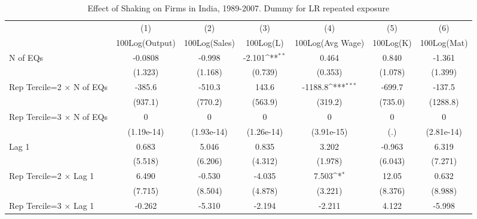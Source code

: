 \begin{table}[htbp]\centering
\def\sym#1{\ifmmode^{#1}\else\(^{#1}\)\fi}
\caption{Effect of Shaking on Firms in India, 1989-2007. Dummy for LR repeated exposure}
\begin{tabular}{l*{6}{c}}
\toprule
                &\multicolumn{1}{c}{(1)}&\multicolumn{1}{c}{(2)}&\multicolumn{1}{c}{(3)}&\multicolumn{1}{c}{(4)}&\multicolumn{1}{c}{(5)}&\multicolumn{1}{c}{(6)}\\
                &\multicolumn{1}{c}{100Log(Output)}&\multicolumn{1}{c}{100Log(Sales)}&\multicolumn{1}{c}{100Log(L)}&\multicolumn{1}{c}{100Log(Avg Wage)}&\multicolumn{1}{c}{100Log(K)}&\multicolumn{1}{c}{100Log(Mat)}\\
\midrule
N of EQs        &  -0.0808         &   -0.998         &   -2.101\sym{**} &    0.464         &    0.840         &   -1.361         \\
                &  (1.323)         &  (1.168)         &  (0.739)         &  (0.353)         &  (1.078)         &  (1.399)         \\
\addlinespace
Rep Tercile=2 $\times$ N of EQs&   -385.6         &   -510.3         &    143.6         &  -1188.8\sym{***}&   -699.7         &   -137.5         \\
                &  (937.1)         &  (770.2)         &  (563.9)         &  (319.2)         &  (735.0)         & (1288.8)         \\
\addlinespace
Rep Tercile=3 $\times$ N of EQs&        0         &        0         &        0         &        0         &        0         &        0         \\
                &(1.19e-14)         &(1.93e-14)         &(1.26e-14)         &(3.91e-15)         &      (.)         &(2.81e-14)         \\
\addlinespace
Lag 1           &    0.683         &    5.046         &    0.835         &    3.202         &   -0.963         &    6.319         \\
                &  (5.518)         &  (6.206)         &  (4.312)         &  (1.978)         &  (6.043)         &  (7.271)         \\
\addlinespace
Rep Tercile=2 $\times$ Lag 1&    6.490         &   -0.530         &   -4.035         &    7.503\sym{*}  &    12.05         &    0.632         \\
                &  (7.715)         &  (8.504)         &  (4.878)         &  (3.221)         &  (8.376)         &  (8.988)         \\
\addlinespace
Rep Tercile=3 $\times$ Lag 1&   -0.262         &   -5.310         &   -2.194         &   -2.211         &    4.122         &   -5.998         \\

\end{tabular}
\end{table}
